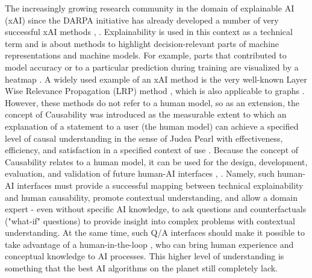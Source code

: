 \documentclass[twoside,11pt]{article}
\begin{document}
The increasingly growing research community in the domain of explainable AI (xAI) since the DARPA \cite{GunningAha:2019:DARPA} initiative has already developed a number of very successful xAI methods \cite{ZhouEtAl:2021:QualitySurvey}, \cite{HolzWoj:2022:XAIOverview}. Explainability is used in this context as a technical term and is about methods to highlight decision-relevant parts of machine representations and machine models. For example, parts that contributed to model accuracy or to a particular prediction during training are visualized by a heatmap \cite{SturmEtAl:2015:InteractiveHeatmap}. A widely used example of an xAI method is the very well-known Layer Wise Relevance Propagation (LRP) method \cite{LapuschkinEtAl:2016:LRP}, which is also applicable to graphs \cite{SchnakeMontavon:2020:XAIgraphs}. However, these methods do not refer to a human model, so as an extension, the concept of Causability \cite{HolzingerEtAl:2019:Wiley-Paper} was introduced as the measurable extent to which an explanation of a statement to a user (the human model) can achieve a specified level of causal understanding in the sense of Judea Pearl \cite{Pearl:2009:Causality} with effectiveness, efficiency, and satisfaction in a specified context of use \cite{HolzingerEtAl:2020:QualityOfExplanations}. Because the concept of Causability relates to a human model, it can be used for the design, development, evaluation, and validation of future human-AI interfaces \cite{HolzingerMueller:2021:HumanAI}, \cite{HolzingerMueller:2022:PersonasAI}. Namely, such human-AI interfaces must provide a successful mapping between technical explainability and human causability, promote contextual understanding, and allow a domain expert - even without specific AI knowledge, to ask questions and counterfactuals ("what-if" questions) \cite{HolzingerEtAl:2021:MultiModalCausabilityGNN} to provide insight into complex problems with contextual understanding. At the same time, such Q/A interfaces should make it possible to take advantage of a human-in-the-loop \cite{Holzinger:2016:iML}, \cite{Holzinger:2019:HumanLoopAPIN} who can bring human experience and conceptual knowledge to AI processes. This higher level of understanding is something that the best AI algorithms on the planet still completely lack. 
\end{document}
